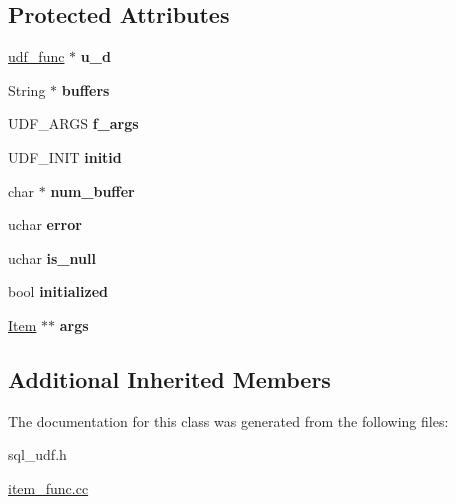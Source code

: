 \subsection*{Protected Attributes}
\begin{DoxyCompactItemize}
\item 
\mbox{\label{classudf__handler_aee5e600627d96961d28786904e6f8b88}} 
\mbox{\hyperlink{structst__udf__func}{udf\+\_\+func}} $\ast$ {\bfseries u\+\_\+d}
\item 
\mbox{\label{classudf__handler_ac7cb173c7d7c487a97bafe588b8e342e}} 
String $\ast$ {\bfseries buffers}
\item 
\mbox{\label{classudf__handler_a99652b3bb6c68336f47c3f19f6c56af2}} 
U\+D\+F\+\_\+\+A\+R\+GS {\bfseries f\+\_\+args}
\item 
\mbox{\label{classudf__handler_a309c04861dadcae46fbde678e7bf89e4}} 
U\+D\+F\+\_\+\+I\+N\+IT {\bfseries initid}
\item 
\mbox{\label{classudf__handler_a5e5aba8ba41698121ddd5e7a52591b68}} 
char $\ast$ {\bfseries num\+\_\+buffer}
\item 
\mbox{\label{classudf__handler_aae23327ae64a3b99e023800fc92c99ee}} 
uchar {\bfseries error}
\item 
\mbox{\label{classudf__handler_a38ba163675a5e96f7c003af3428d8abe}} 
uchar {\bfseries is\+\_\+null}
\item 
\mbox{\label{classudf__handler_a0b6b0e3caeccac63f1bea031c11d0ccb}} 
bool {\bfseries initialized}
\item 
\mbox{\label{classudf__handler_a80d7908cd4b32fba94962cbe6c086c2a}} 
\mbox{\hyperlink{classItem}{Item}} $\ast$$\ast$ {\bfseries args}
\end{DoxyCompactItemize}
\subsection*{Additional Inherited Members}


The documentation for this class was generated from the following files\+:\begin{DoxyCompactItemize}
\item 
sql\+\_\+udf.\+h\item 
\mbox{\hyperlink{item__func_8cc}{item\+\_\+func.\+cc}}\end{DoxyCompactItemize}
